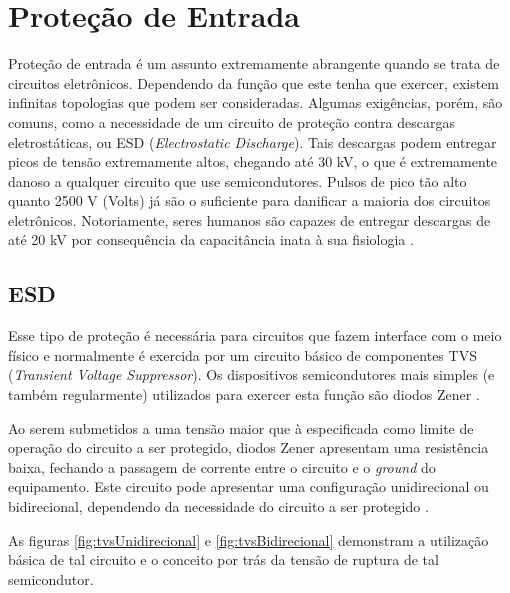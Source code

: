 
\section{Proteção de Entrada}\label{sec:InputProtection}

Proteção de entrada é um assunto extremamente abrangente quando se trata de circuitos eletrônicos. Dependendo da função que este tenha que exercer, existem infinitas topologias que podem ser consideradas. Algumas exigências, porém, são comuns, como a necessidade de um circuito de proteção contra descargas eletrostáticas, ou \gls{ESD} (\textit{Electrostatic Discharge}). Tais descargas podem entregar picos de tensão extremamente altos, chegando até 30 kV, o que é extremamente danoso a qualquer circuito que use semicondutores. Pulsos de pico tão alto quanto 2500 V (Volts) já são o suficiente para danificar a maioria dos circuitos eletrônicos. Notoriamente, seres humanos são capazes de entregar descargas de até 20 kV por consequência da capacitância inata à sua fisiologia \cite{ONsemicondTVS2}.

\subsection{ESD}\label{subsec:electrostaticDischarge}
Esse tipo de proteção é necessária para circuitos que fazem interface com o meio físico e normalmente é exercida por um circuito básico de componentes \gls{TVS} (\textit{Transient Voltage Suppressor}). Os dispositivos semicondutores mais simples (e também regularmente) utilizados para exercer esta função são diodos Zener \cite{IPblog}.

Ao serem submetidos a uma tensão maior que à especificada como limite de operação do circuito a ser protegido, diodos Zener apresentam uma resistência baixa, fechando a passagem de corrente entre o circuito e o \textit{ground} do equipamento. Este circuito pode apresentar uma configuração unidirecional ou bidirecional, dependendo da necessidade do circuito a ser protegido \cite{TIESD}.

As figuras \ref{fig:tvsUnidirecional} e \ref{fig:tvsBidirecional} demonstram a utilização básica de tal circuito e o conceito por trás da tensão de ruptura de tal semicondutor.

